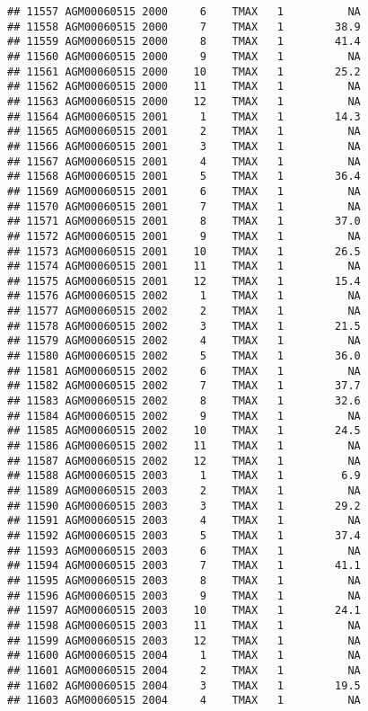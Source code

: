 \documentclass{article}\usepackage[]{graphicx}\usepackage[]{color}
\makeatletter
\newenvironment{kframe}{%
 \def\at@end@of@kframe{}%
 \ifinner\ifhmode%
  \def\at@end@of@kframe{\end{minipage}}%
  \begin{minipage}{\columnwidth}%
 \fi\fi%
 \def\FrameCommand##1{\hskip\@totalleftmargin \hskip-\fboxsep
 \colorbox{shadecolor}{##1}\hskip-\fboxsep
     \hskip-\linewidth \hskip-\@totalleftmargin \hskip\columnwidth}%
 \MakeFramed {\advance\hsize-\width
   \@totalleftmargin\z@ \linewidth\hsize
   \@setminipage}}%
 {\par\unskip\endMakeFramed%
 \at@end@of@kframe}
\newenvironment{knitrout}{}{} %
\makeatother
\begin{document}
\begin{knitrout}
\begin{kframe}
\begin{verbatim}
## 11557 AGM00060515 2000     6    TMAX   1          NA
## 11558 AGM00060515 2000     7    TMAX   1        38.9
## 11559 AGM00060515 2000     8    TMAX   1        41.4
## 11560 AGM00060515 2000     9    TMAX   1          NA
## 11561 AGM00060515 2000    10    TMAX   1        25.2
## 11562 AGM00060515 2000    11    TMAX   1          NA
## 11563 AGM00060515 2000    12    TMAX   1          NA
## 11564 AGM00060515 2001     1    TMAX   1        14.3
## 11565 AGM00060515 2001     2    TMAX   1          NA
## 11566 AGM00060515 2001     3    TMAX   1          NA
## 11567 AGM00060515 2001     4    TMAX   1          NA
## 11568 AGM00060515 2001     5    TMAX   1        36.4
## 11569 AGM00060515 2001     6    TMAX   1          NA
## 11570 AGM00060515 2001     7    TMAX   1          NA
## 11571 AGM00060515 2001     8    TMAX   1        37.0
## 11572 AGM00060515 2001     9    TMAX   1          NA
## 11573 AGM00060515 2001    10    TMAX   1        26.5
## 11574 AGM00060515 2001    11    TMAX   1          NA
## 11575 AGM00060515 2001    12    TMAX   1        15.4
## 11576 AGM00060515 2002     1    TMAX   1          NA
## 11577 AGM00060515 2002     2    TMAX   1          NA
## 11578 AGM00060515 2002     3    TMAX   1        21.5
## 11579 AGM00060515 2002     4    TMAX   1          NA
## 11580 AGM00060515 2002     5    TMAX   1        36.0
## 11581 AGM00060515 2002     6    TMAX   1          NA
## 11582 AGM00060515 2002     7    TMAX   1        37.7
## 11583 AGM00060515 2002     8    TMAX   1        32.6
## 11584 AGM00060515 2002     9    TMAX   1          NA
## 11585 AGM00060515 2002    10    TMAX   1        24.5
## 11586 AGM00060515 2002    11    TMAX   1          NA
## 11587 AGM00060515 2002    12    TMAX   1          NA
## 11588 AGM00060515 2003     1    TMAX   1         6.9
## 11589 AGM00060515 2003     2    TMAX   1          NA
## 11590 AGM00060515 2003     3    TMAX   1        29.2
## 11591 AGM00060515 2003     4    TMAX   1          NA
## 11592 AGM00060515 2003     5    TMAX   1        37.4
## 11593 AGM00060515 2003     6    TMAX   1          NA
## 11594 AGM00060515 2003     7    TMAX   1        41.1
## 11595 AGM00060515 2003     8    TMAX   1          NA
## 11596 AGM00060515 2003     9    TMAX   1          NA
## 11597 AGM00060515 2003    10    TMAX   1        24.1
## 11598 AGM00060515 2003    11    TMAX   1          NA
## 11599 AGM00060515 2003    12    TMAX   1          NA
## 11600 AGM00060515 2004     1    TMAX   1          NA
## 11601 AGM00060515 2004     2    TMAX   1          NA
## 11602 AGM00060515 2004     3    TMAX   1        19.5
## 11603 AGM00060515 2004     4    TMAX   1          NA

\end{verbatim}
\end{kframe}
\end{knitrout}
\end{document}
